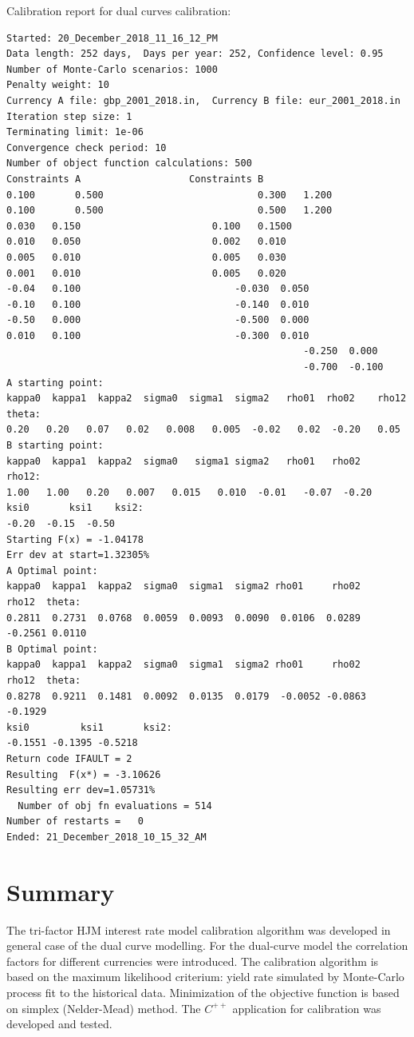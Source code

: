 \documentclass[10pt]{article}
\begin{document}
\begin{tcolorbox}

Calibration report for dual curves calibration:

\begin{verbatim}
Started: 20_December_2018_11_16_12_PM
Data length: 252 days,	Days per year: 252,	Confidence level: 0.95
Number of Monte-Carlo scenarios: 1000
Penalty weight: 10
Currency A file: gbp_2001_2018.in,	Currency B file: eur_2001_2018.in
Iteration step size: 1
Terminating limit: 1e-06
Convergence check period: 10
Number of object function calculations: 500
Constraints A			     	Constraints	B
0.100		0.500		     				0.300	1.200
0.100		0.500				     		0.500	1.200
0.030	0.150				     	0.100	0.1500
0.010	0.050				     	0.002	0.010
0.005	0.010				     	0.005	0.030
0.001	0.010				     	0.005	0.020
-0.04	0.100				     		-0.030	0.050
-0.10	0.100				     		-0.140	0.010
-0.50	0.000				     		-0.500	0.000
0.010	0.100				     		-0.300	0.010
						     		     	     	-0.250	0.000
							 	         	     	-0.700	-0.100
A starting point:
kappa0	kappa1	kappa2	sigma0	sigma1	sigma2   rho01	rho02	 rho12	  theta:
0.20   0.20   0.07   0.02   0.008   0.005  -0.02   0.02  -0.20   0.05
B starting point:
kappa0	kappa1	kappa2	sigma0	 sigma1	sigma2   rho01	 rho02	  rho12:
1.00   1.00   0.20   0.007   0.015   0.010  -0.01   -0.07  -0.20 
ksi0	   ksi1	   ksi2:
-0.20  -0.15  -0.50
Starting F(x) = -1.04178
Err dev at start=1.32305%
A Optimal point:
kappa0	kappa1	kappa2	sigma0	sigma1	sigma2 rho01	 rho02	  rho12	 theta:
0.2811	0.2731	0.0768	0.0059	0.0093	0.0090	0.0106	0.0289	-0.2561	0.0110
B Optimal point:
kappa0	kappa1	kappa2	sigma0	sigma1	sigma2 rho01	 rho02	  rho12	 theta:
0.8278	0.9211	0.1481	0.0092	0.0135	0.0179	-0.0052	-0.0863	-0.1929
ksi0	     ksi1   	ksi2:
-0.1551	-0.1395	-0.5218
Return code IFAULT = 2
Resulting  F(x*) = -3.10626
Resulting err dev=1.05731%
  Number of obj fn evaluations = 514
Number of restarts =   0
Ended: 21_December_2018_10_15_32_AM
\end{verbatim}
\end{tcolorbox}

\section{Summary} 


The tri-factor HJM interest rate model calibration algorithm was developed in general case of the dual curve modelling. For the dual-curve model the correlation factors for different currencies were introduced. The calibration algorithm is based on the maximum likelihood criterium: yield rate simulated by Monte-Carlo process fit to the historical data. Minimization of the objective function is based on simplex (Nelder-Mead) method. The $C^{++}$ application for calibration was developed and tested. 



\end{document}
